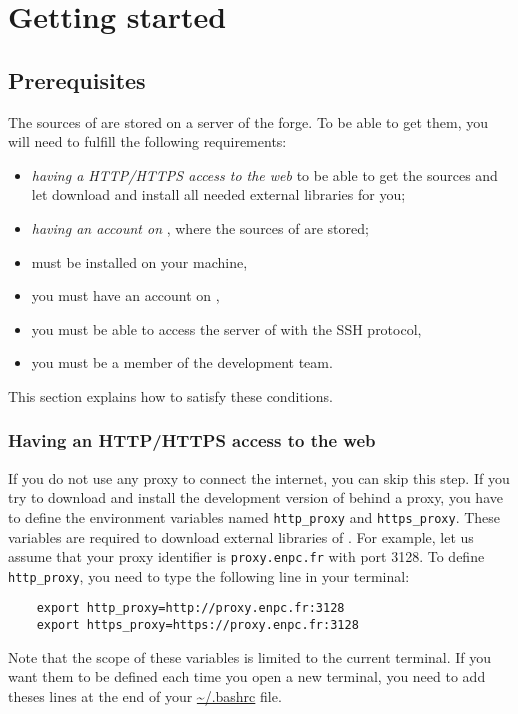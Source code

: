 \chapter{Getting started}


\section{Prerequisites}

The sources of \Simol are stored on a server of the \SourceSup forge. To be able to get them, you will need to fulfill the following requirements:
\begin{itemize}
\item \textit{having a HTTP/HTTPS access to the web} to be able to get the sources and let \Simol download and install all needed external libraries for you; 
\item \textit{having an account on \SourceSup}, where the sources of \Simol are stored;
\item \Git must be installed on your machine,
\item you must have an account on \SourceSup,
\item you must be able to access the server of \SourceSup with the SSH protocol,
\item you must be a member of the \Simol development team.
\end{itemize}
This section explains how to satisfy these conditions.

\subsection{Having an HTTP/HTTPS access to the web}

If you do not use any proxy to connect the internet, you can skip this step. If you try to download and install the development version of \Simol behind a proxy, you have to define the environment variables named \texttt{http\_proxy} and \texttt{https\_proxy}. These variables are required to download external libraries of \Simol. For example, let us assume that your proxy identifier is \texttt{proxy.enpc.fr} with port 3128. To define \texttt{http\_proxy}, you need to type the following line in your terminal:

\begin{verbatim}
    export http_proxy=http://proxy.enpc.fr:3128
    export https_proxy=https://proxy.enpc.fr:3128
\end{verbatim}

Note that the scope of these variables is limited to the current terminal. If you want them to be defined each time you open a new terminal, you need to add theses lines at the end of your \url{~/.bashrc} file.


